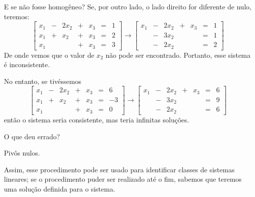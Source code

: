 \documentclass{beamer}
\begin{document}
\begin{darkframes}
\begin{frame}{E se não fosse homogêneo?}
	Se, por outro lado, o lado direito for diferente de nulo, teremos:
	\begin{equation*}
		\begin{bmatrix}
			x_1 & -& 2x_2 & +&x_3&=&1\\
			x_1&+&x_2&+&x_3&=&2\\
			x_1& & &+&x_3 &=& 3
		\end{bmatrix} \rightarrow 
		\begin{bmatrix}
			x_1 & -& 2x_2 & +&x_3&=&1\\
			 &-&3x_2&&&=&1\\
			&-&2x_2 & & &=& 2
		\end{bmatrix}
	\end{equation*}
	De onde vemos que o valor de $x_2$ não pode ser encontrado. Portanto, esse sistema é inconsistente.

	No entanto, se tivéssemos
	\begin{equation*}
		\begin{bmatrix}
			x_1 & -& 2x_2 & +&x_3&=&6\\
			x_1&+&x_2&+&x_3&=&-3\\
			x_1& & &+&x_3 &=& 0
		\end{bmatrix} \rightarrow 
		\begin{bmatrix}
			x_1 & -& 2x_2 & +&x_3&=&6\\
			 &-&3x_2&&&=&9\\
			&-&2x_2 & & &=& 6
		\end{bmatrix}
	\end{equation*}
	então o sistema seria consistente, mas teria infinitas soluções.
\end{frame}

\begin{frame}{O que deu errado?}
\begin{center}
    \alert{Pivôs nulos.}
\end{center}

\vfill 

Assim, esse procedimento pode ser usado para identificar classes de sistemas lineares; se o procedimento puder ser realizado até o fim, sabemos que teremos uma solução definida para o sistema.
\end{frame}


\end{darkframes}
\end{document}
